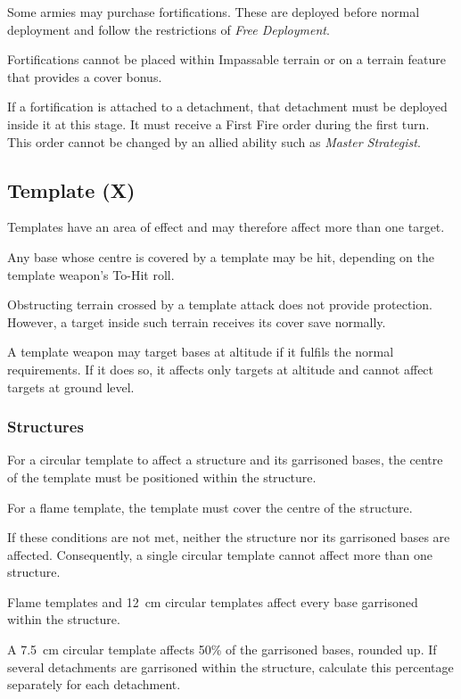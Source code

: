 Some armies may purchase fortifications. These are deployed before normal deployment and follow the restrictions of \textit{Free Deployment}.

Fortifications cannot be placed within Impassable terrain or on a terrain feature that provides a cover bonus.

If a fortification is attached to a detachment, that detachment must be deployed inside it at this stage. It must receive a First Fire order during the first turn. This order cannot be changed by an allied ability such as \textit{Master Strategist}.

\subsection{Template (X)}

Templates have an area of effect and may therefore affect more than one target.

Any base whose centre is covered by a template may be hit, depending on the template weapon's To-Hit roll.

Obstructing terrain crossed by a template attack does not provide protection. However, a target inside such terrain receives its cover save normally.

A template weapon may target bases at altitude if it fulfils the normal requirements. If it does so, it affects only targets at altitude and cannot affect targets at ground level.

\subsubsection{Structures}

For a circular template to affect a structure and its garrisoned bases, the centre of the template must be positioned within the structure.

For a flame template, the template must cover the centre of the structure.

If these conditions are not met, neither the structure nor its garrisoned bases are affected. Consequently, a single circular template cannot affect more than one structure.

Flame templates and 12~cm circular templates affect every base garrisoned within the structure.

A 7.5~cm circular template affects 50\% of the garrisoned bases, rounded up. If several detachments are garrisoned within the structure, calculate this percentage separately for each detachment.

